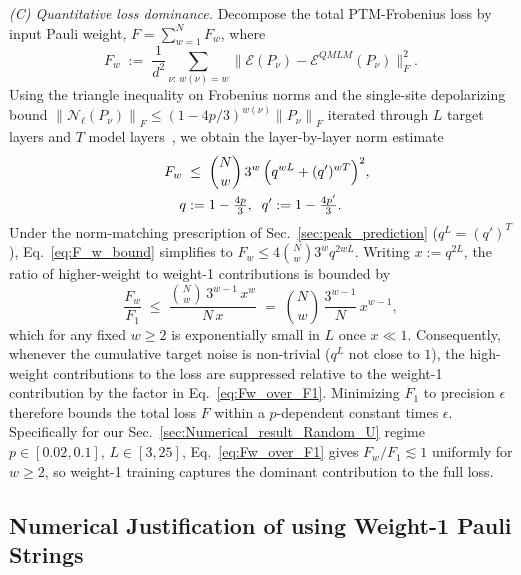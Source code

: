 \documentclass[%
 reprint,
superscriptaddress,
 amsmath,amssymb,
 aps,
]{revtex4-2}
\newcommand{\E}{\mathcal{E}}
\newcommand{\norm}[1]{\left\lVert#1\right\rVert}
\begin{document}
\emph{(C) Quantitative loss dominance.}
Decompose the total PTM-Frobenius loss by input Pauli weight, $F = \sum_{w=1}^N F_w$, where
\begin{equation}
    F_w \;:=\; \frac{1}{d^2}\sum_{\nu:\,w(\nu)=w} \bigl\|\E(P_\nu)-\E^{QMLM}(P_\nu)\bigr\|_F^2.
\end{equation}
Using the triangle inequality on Frobenius norms and the single-site depolarizing bound $\norm{\mathcal{N}_\ell(P_\nu)}_F \le (1-4p/3)^{w(\nu)}\norm{P_\nu}_F$ iterated through $L$ target layers and $T$ model layers~\cite{nielsen2002simple,magesan2012characterizing}, we obtain the layer-by-layer norm estimate
\begin{equation}
    \begin{split}
    F_w \;&\le\; \binom{N}{w}\,3^w\,\Bigl(q^{wL}+(q')^{wT}\Bigr)^2, \\
    \qquad q &:= 1-\tfrac{4p}{3},\;\; q' := 1-\tfrac{4p'}{3}.
    \end{split}
    \label{eq:F_w_bound}
\end{equation}
Under the norm-matching prescription of Sec.~\ref{sec:peak_prediction} ($q^L = (q')^T$), Eq.~\eqref{eq:F_w_bound} simplifies to $F_w \le 4\binom{N}{w}3^w q^{2wL}$. Writing $x := q^{2L}$, the ratio of higher-weight to weight-1 contributions is bounded by
\begin{equation}
    \frac{F_w}{F_1} \;\le\; \frac{\binom{N}{w}\,3^{w-1}\,x^{w}}{N\,x} \;=\; \binom{N}{w}\,\frac{3^{w-1}}{N}\,x^{w-1},
    \label{eq:Fw_over_F1}
\end{equation}
which for any fixed $w\ge 2$ is exponentially small in $L$ once $x\ll 1$. Consequently, whenever the cumulative target noise is non-trivial ($q^{L}$ not close to $1$), the high-weight contributions to the loss are suppressed relative to the weight-1 contribution by the factor in Eq.~\eqref{eq:Fw_over_F1}. Minimizing $F_1$ to precision $\epsilon$ therefore bounds the total loss $F$ within a $p$-dependent constant times $\epsilon$. Specifically for our Sec.~\ref{sec:Numerical_result_Random_U} regime $p\in[0.02,0.1]$, $L\in[3,25]$, Eq.~\eqref{eq:Fw_over_F1} gives $F_w/F_1\lesssim 1$ uniformly for $w\ge 2$, so weight-1 training captures the dominant contribution to the full loss.

\subsection{Numerical Justification of using Weight-1 Pauli Strings}
\end{document}
